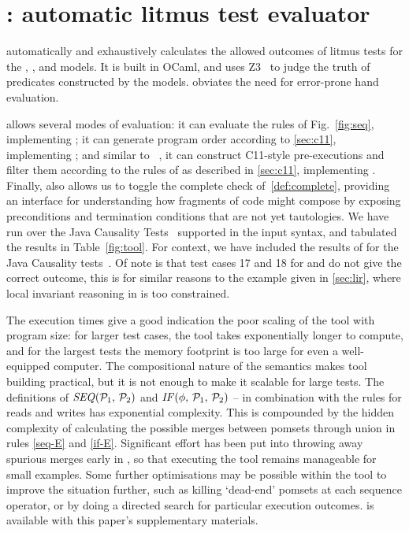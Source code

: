 
\section{\PwTerTITLE: automatic litmus test evaluator}
\label{sec:tool}

\PwTer{} automatically and exhaustively calculates the allowed outcomes of litmus tests for the \PwT, \PwTpo, and \PwTc{} models. It is built in OCaml, and uses Z3~\cite{Z3Solver} to judge the truth of predicates constructed by the models. \PwTer{} obviates the need for error-prone hand evaluation.

\PwTer{} allows several modes of evaluation: it can evaluate the rules of Fig.~\ref{fig:seq}, implementing \PwT; it can generate program order according to \textsection\ref{sec:c11}, implementing \PwTpo; and similar to \MRD~\cite{DBLP:conf/esop/PaviottiCPWOB20}, it can construct C11-style pre-executions and filter them according to the rules of \rcXI{} as described in \textsection\ref{sec:c11}, implementing \PwTc{}.
Finally, \PwTer{} also allows us to toggle the complete check of~\ref{def:complete}, providing an interface for understanding how fragments of code might compose by exposing preconditions and termination conditions that are not yet tautologies.
We have run \PwTer{} over the Java Causality Tests~\cite{PughWebsite} supported in the input syntax, and tabulated the results in Table~\ref{fig:tool}.
For context, we have included the results of \MRD{} for the Java Causality tests~\cite{DBLP:conf/esop/PaviottiCPWOB20}.
Of note is that test cases 17 and 18 for \MRD{} and \MRDRC{} do not give the correct outcome, this is for similar reasons to the example given in \textsection\ref{sec:lir}, where local invariant reasoning in \MRD{} is too constrained.

The execution times give a good indication the poor scaling of the tool with program size: for larger test cases, the tool takes exponentially longer to compute, and for the largest tests the memory footprint is too large for even a well-equipped computer.
The compositional nature of the semantics makes tool building practical, but it is not enough to make it scalable for large tests.
The definitions of $\sSEMI{\aPSS_1}{\aPSS_2}$ and $\sIF{\aForm}\sTHEN\aPSS_1\sELSE\aPSS_2\sFI$ -- in combination with the rules for reads and writes has exponential complexity.
This is compounded by the hidden complexity of calculating the possible merges between pomsets through union in rules \ref{seq-E} and \ref{if-E}.
Significant effort has been put into throwing away spurious merges early in \PwTer, so that executing the tool remains manageable for small examples.
Some further optimisations may be possible within the tool to improve the situation further, such as killing `dead-end' pomsets at each sequence operator, or by doing a directed search for particular execution outcomes.
\PwTer{} is available with this paper's supplementary materials.



